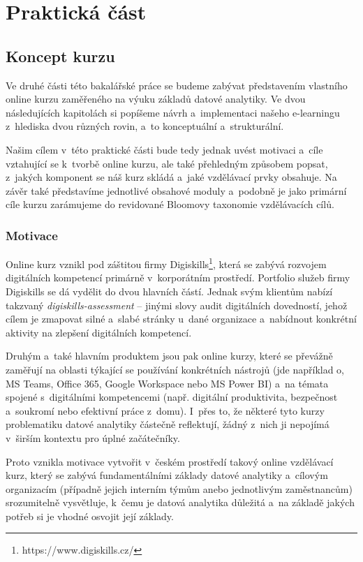 \part{Praktická část}

\hypertarget{koncept-kurzu}{%
\chapter{Koncept kurzu}\label{koncept-kurzu}}

Ve druhé části této bakalářské práce se budeme zabývat představením vlastního online kurzu zaměřeného na výuku základů datové analytiky. Ve dvou následujících kapitolách si popíšeme návrh a~implementaci našeho e-learningu z~hlediska dvou různých rovin, a~to konceptuální a~strukturální.

Našim cílem v~této praktické části bude tedy jednak uvést motivaci a~cíle vztahující se k~tvorbě online kurzu, ale také přehledným způsobem popsat, z~jakých komponent se náš kurz skládá a~jaké vzdělávací prvky obsahuje. Na závěr také představíme jednotlivé obsahové moduly a~podobně je jako primární cíle kurzu zarámujeme do revidované Bloomovy taxonomie vzdělávacích cílů.

\hypertarget{motivace}{%
\section{Motivace}\label{motivace}}

Online kurz vznikl pod záštitou firmy Digiskills\footnote{https://www.digiskills.cz/}, která se zabývá rozvojem digitálních kompetencí primárně v~korporátním prostředí. Portfolio služeb firmy Digiskills se dá vydělit do dvou hlavních částí. Jednak svým klientům nabízí takzvaný \emph{digiskills-assessment} -- jinými slovy audit digitálních dovedností, jehož cílem je zmapovat silné a~slabé stránky u~dané organizace a~nabídnout konkrétní aktivity na zlepšení digitálních kompetencí.

Druhým a~také hlavním produktem jsou pak online kurzy, které se převážně zaměřují na oblasti týkající se používání konkrétních nástrojů (jde například o, MS Teams, Office 365, Google Workspace nebo MS Power BI) a~na témata spojené s~digitálními kompetencemi (např. digitální produktivita, bezpečnost a~soukromí nebo efektivní práce z~domu). I~přes to, že některé tyto kurzy problematiku datové analytiky částečně reflektují, žádný z~nich ji nepojímá v~širším kontextu pro úplné začátečníky.

Proto vznikla motivace vytvořit v~českém prostředí takový online vzdělávací kurz, který se zabývá fundamentálními základy datové analytiky a~cílovým organizacím (případně jejich interním týmům anebo jednotlivým zaměstnancům) srozumitelně vysvětluje, k~čemu je datová analytika důležitá a~na základě jakých potřeb si je vhodné osvojit její základy.

